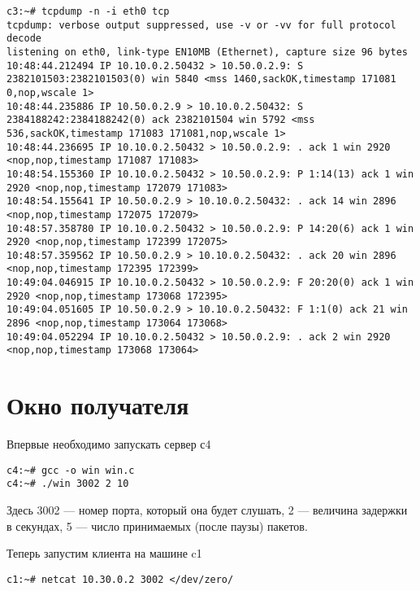 \documentclass[a4paper,12pt]{article}
\begin{document}
\begin{lstlisting}
c3:~# tcpdump -n -i eth0 tcp
tcpdump: verbose output suppressed, use -v or -vv for full protocol decode
listening on eth0, link-type EN10MB (Ethernet), capture size 96 bytes
10:48:44.212494 IP 10.10.0.2.50432 > 10.50.0.2.9: S 2382101503:2382101503(0) win 5840 <mss 1460,sackOK,timestamp 171081 0,nop,wscale 1>
10:48:44.235886 IP 10.50.0.2.9 > 10.10.0.2.50432: S 2384188242:2384188242(0) ack 2382101504 win 5792 <mss 536,sackOK,timestamp 171083 171081,nop,wscale 1>
10:48:44.236695 IP 10.10.0.2.50432 > 10.50.0.2.9: . ack 1 win 2920 <nop,nop,timestamp 171087 171083>
10:48:54.155360 IP 10.10.0.2.50432 > 10.50.0.2.9: P 1:14(13) ack 1 win 2920 <nop,nop,timestamp 172079 171083>
10:48:54.155641 IP 10.50.0.2.9 > 10.10.0.2.50432: . ack 14 win 2896 <nop,nop,timestamp 172075 172079>
10:48:57.358780 IP 10.10.0.2.50432 > 10.50.0.2.9: P 14:20(6) ack 1 win 2920 <nop,nop,timestamp 172399 172075>
10:48:57.359562 IP 10.50.0.2.9 > 10.10.0.2.50432: . ack 20 win 2896 <nop,nop,timestamp 172395 172399>
10:49:04.046915 IP 10.10.0.2.50432 > 10.50.0.2.9: F 20:20(0) ack 1 win 2920 <nop,nop,timestamp 173068 172395>
10:49:04.051605 IP 10.50.0.2.9 > 10.10.0.2.50432: F 1:1(0) ack 21 win 2896 <nop,nop,timestamp 173064 173068>
10:49:04.052294 IP 10.10.0.2.50432 > 10.50.0.2.9: . ack 2 win 2920 <nop,nop,timestamp 173068 173064>
\end{lstlisting}

\section{Окно получателя}

Впервые необходимо запускать сервер с4

\begin{lstlisting}
c4:~# gcc -o win win.c
c4:~# ./win 3002 2 10
\end{lstlisting}

Здесь 3002 — номер порта, который она будет слушать, 2 — величина задержки в секундах, 5 — число принимаемых (после паузы) пакетов.

Теперь запустим клиента на машине c1
\begin{lstlisting}
c1:~# netcat 10.30.0.2 3002 </dev/zero/
\end{lstlisting}
\end{document}
